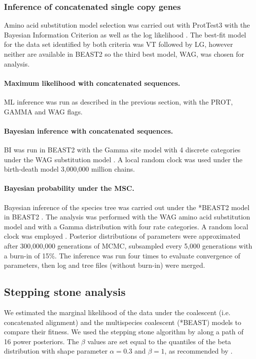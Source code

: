 \documentclass[fleqn,10pt,lineno]{wlpeerj} %
\begin{document}
\subsubsection*{Inference of concatenated single copy genes}
Amino acid substitution model selection was carried out with ProtTest3 with the Bayesian Information Criterion as well as the log likelihood \citep{darriba2011prottest,guindon2003simple}. 
The best-fit model for the data set identified by both criteria was VT followed by LG, however neither are available in BEAST2 so the third best model, WAG, was chosen for analysis. 
\paragraph*{Maximum likelihood with concatenated sequences.}
ML inference was run as described in the previous section, with the PROT, GAMMA and WAG flags.
\paragraph*{Bayesian inference with concatenated sequences.}
BI was run in BEAST2 with the Gamma site model with 4 discrete categories under the WAG substitution model \citep{whelan2001general}. A local random clock was used under the birth-death model 3,000,000 million chains.
\paragraph*{Bayesian probability under the MSC.}
Bayesian inference of the species tree was carried out under the *BEAST2 model in BEAST2 \citep{bouckaert2014beast}. 
The analysis was performed with the WAG amino acid substitution model \citep{whelan2001general} and with a Gamma distribution with four rate categories. 
A random local clock was employed \citep{drummond2010bayesian}. 
Posterior distributions of parameters were approximated after 300,000,000 generations of MCMC, subsampled every 5,000 generations with a burn-in of 15\%. 
The inference was run four times to evaluate convergence of parameters, then log and tree files (without burn-in) were merged. 


\subsection*{Stepping stone analysis}
We estimated the marginal likelihood of the data under the coalescent (i.e. concatenated alignment) and the multispecies coalescent (*BEAST) models to compare their fitness.
We used the stepping stone algorithm by \cite{xie2011improving} along a path of 16 power posteriors.
The $\beta$ values are set equal to the quantiles of the beta distribution with shape parameter $\alpha=0.3$ and $\beta = 1$, as recommended by \cite{xie2011improving}.
\end{document}
